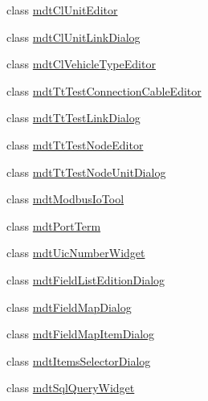 \begin{DoxyCompactItemize}
\item 
class \hyperlink{class_ui_1_1mdt_cl_unit_editor}{mdt\-Cl\-Unit\-Editor}
\item 
class \hyperlink{class_ui_1_1mdt_cl_unit_link_dialog}{mdt\-Cl\-Unit\-Link\-Dialog}
\item 
class \hyperlink{class_ui_1_1mdt_cl_vehicle_type_editor}{mdt\-Cl\-Vehicle\-Type\-Editor}
\item 
class \hyperlink{class_ui_1_1mdt_tt_test_connection_cable_editor}{mdt\-Tt\-Test\-Connection\-Cable\-Editor}
\item 
class \hyperlink{class_ui_1_1mdt_tt_test_link_dialog}{mdt\-Tt\-Test\-Link\-Dialog}
\item 
class \hyperlink{class_ui_1_1mdt_tt_test_node_editor}{mdt\-Tt\-Test\-Node\-Editor}
\item 
class \hyperlink{class_ui_1_1mdt_tt_test_node_unit_dialog}{mdt\-Tt\-Test\-Node\-Unit\-Dialog}
\item 
class \hyperlink{class_ui_1_1mdt_modbus_io_tool}{mdt\-Modbus\-Io\-Tool}
\item 
class \hyperlink{class_ui_1_1mdt_port_term}{mdt\-Port\-Term}
\item 
class \hyperlink{class_ui_1_1mdt_uic_number_widget}{mdt\-Uic\-Number\-Widget}
\item 
class \hyperlink{class_ui_1_1mdt_field_list_edition_dialog}{mdt\-Field\-List\-Edition\-Dialog}
\item 
class \hyperlink{class_ui_1_1mdt_field_map_dialog}{mdt\-Field\-Map\-Dialog}
\item 
class \hyperlink{class_ui_1_1mdt_field_map_item_dialog}{mdt\-Field\-Map\-Item\-Dialog}
\item 
class \hyperlink{class_ui_1_1mdt_items_selector_dialog}{mdt\-Items\-Selector\-Dialog}
\item 
class \hyperlink{class_ui_1_1mdt_sql_query_widget}{mdt\-Sql\-Query\-Widget}
\end{DoxyCompactItemize}
